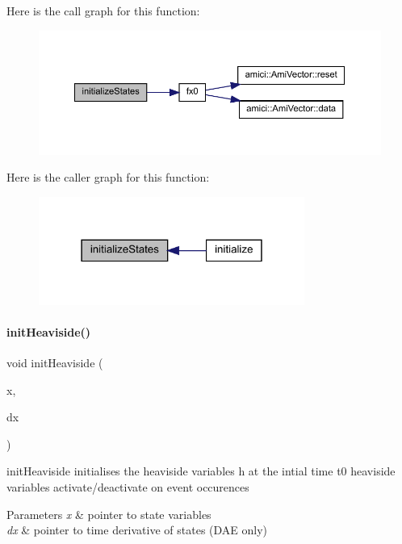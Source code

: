 Here is the call graph for this function\+:
\nopagebreak
\begin{figure}[H]
\begin{center}
\leavevmode
\includegraphics[width=350pt]{classamici_1_1_model_a73d147a7108479e20833ba816cac0f6b_cgraph}
\end{center}
\end{figure}
Here is the caller graph for this function\+:
\nopagebreak
\begin{figure}[H]
\begin{center}
\leavevmode
\includegraphics[width=247pt]{classamici_1_1_model_a73d147a7108479e20833ba816cac0f6b_icgraph}
\end{center}
\end{figure}
\mbox{\label{classamici_1_1_model_afc1c1ffc33f397ed131f85c8321dd677}} 
\paragraph{\texorpdfstring{init\+Heaviside()}{initHeaviside()}}
{\footnotesize\ttfamily void init\+Heaviside (\begin{DoxyParamCaption}\item[{\mbox{\hyperlink{classamici_1_1_ami_vector}{Ami\+Vector}} $\ast$}]{x,  }\item[{\mbox{\hyperlink{classamici_1_1_ami_vector}{Ami\+Vector}} $\ast$}]{dx }\end{DoxyParamCaption})}

init\+Heaviside initialises the heaviside variables h at the intial time t0 heaviside variables activate/deactivate on event occurences 
\begin{DoxyParams}{Parameters}
{\em x} & pointer to state variables \\
\hline
{\em dx} & pointer to time derivative of states (D\+AE only) \\
\hline
\end{DoxyParams}


